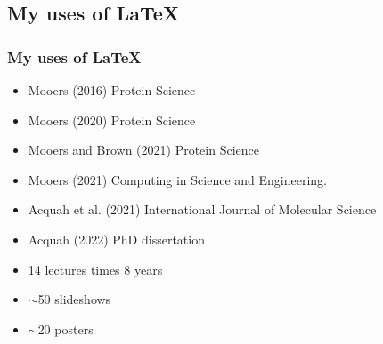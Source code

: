 \documentclass{beamer}
\begin{document}
\subsection{My uses of \LaTeX}
\begin{frame}
\frametitle{My uses of \LaTeX }
\begin{center}
\begin{Large}
\begin{itemize}[font=$\bullet$\scshape\bfseries]
\item Mooers (2016) Protein Science
\item Mooers (2020) Protein Science
\item Mooers and Brown (2021) Protein Science
\item Mooers (2021) Computing in Science and Engineering.
\item Acquah et al. (2021) International Journal of Molecular Science
\item Acquah (2022) PhD dissertation
\item 14 lectures times 8 years
\item $\sim$50 slideshows
\item $\sim$20 posters
\end{itemize}
\end{Large}
\end{center}
\end{frame}



\end{document}

